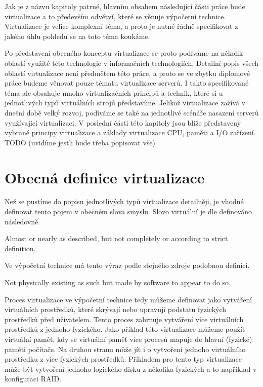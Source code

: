 \label{chapter:virtualization}

Jak je z názvu kapitoly patrné, hlavním obsahem následující části práce bude virtualizace a to především odvětví, které se věnuje výpočetní technice. Virtualizace je velice komplexní téma, a proto je nutné řádně
specifikovat z jakého úhlu pohledu se na toto téma koukáme.

Po představení obecného konceptu virtualizace se proto podíváme na několik oblastí využité této technologie v informačních technologiích. Detailní popis všech oblastí virtualizace není předmětem této práce, a proto
se ve zbytku diplomové práce budeme věnovat pouze tématu virtualizace serverů. I takto specifikované téma ale obsahuje mnoho virtualizačních principů a technik, které si u jednotlivých typů virtuálních strojů představíme.
Jelikož virtualizace zažívá v dnešní době velký rozvoj, podíváme se také na jednotlivé scénáře nasazení serverů využívající virtualizaci. V poslední části této kapitoly jsou blíže představeny vybrané principy
virtualizace a základy virtualizace CPU, paměti a I/O zařízení. TODO (uvidíme jestli bude třeba popisovat vše)

\section{Obecná definice virtualizace}
\label{section:virtualization:definition}

Než se pustíme do popisu jednotlivých typů virtualizace detailněji, je vhodné definovat tento pojem v obecném slova smyslu. Slovo virtuální je dle \cite{oxford:dictionary:virtual} definováno následovně.

\begin{definition}[Virtual]
  \label{definition:virtual}
  Almost or nearly as described, but not completely or according to strict definition.
\end{definition}

Ve výpočetní technice má tento výraz podle stejného zdroje \cite{oxford:dictionary:virtual} podobnou definici.

\begin{definition}
  \label{definition:virtual_computing}
  Not physically existing as such but made by software to appear to do so.
\end{definition}

Proces virtualizace ve výpočetní technice tedy můžeme definovat jako vytváření virtuálních prostředků, které skrývají nebo upravují podstatu fyzických prostředků před uživatelem. Tento proces zahrnuje vytváření více
virtuálních prostředků z jednoho fyzického. Jako příklad této virtualizace můžeme použít virtuální paměť, kdy se virtuální paměť více procesů mapuje do hlavní (fyzické) paměti počítače. Na druhou stranu může jít i o
vytvoření jednoho virtuálního prostředku z více fyzických prostředků. Příkladem pro tento typ virtualizace může být vytvoření jednoho logického disku z několika fyzických a to například v konfiguraci RAID. 

